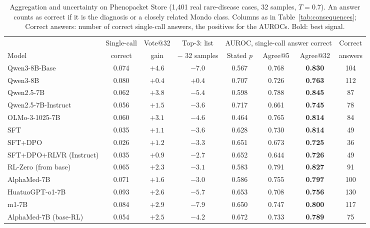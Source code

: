 \documentclass[wcp]{jmlr}
\begin{document}
\begin{table}[t]
\centering\small
\begin{adjustbox}{max width=\linewidth}
\begin{tabular}{lccccccc}
\toprule
 & Single-call & Vote@32 & Top-3: list & \multicolumn{3}{c}{AUROC, single-call answer correct} & Correct \\
Model & correct & gain & $-$ 32 samples & Stated $p$ & Agree@5 & Agree@32 & answers \\
\midrule
Qwen3-8B-Base & 0.074 & $+4.6$ & $-7.0$ & 0.567 & 0.768 & \textbf{0.830} & 104 \\
Qwen3-8B & 0.080 & $+0.4$ & $+0.4$ & 0.707 & 0.726 & \textbf{0.763} & 112 \\
Qwen2.5-7B & 0.062 & $+3.8$ & $-5.4$ & 0.598 & 0.788 & \textbf{0.845} & 87 \\
Qwen2.5-7B-Instruct & 0.056 & $+1.5$ & $-3.6$ & 0.717 & 0.661 & \textbf{0.745} & 78 \\
\midrule
OLMo-3-1025-7B & 0.060 & $+3.1$ & $-4.6$ & 0.464 & 0.765 & \textbf{0.814} & 84 \\
\quad SFT & 0.035 & $+1.1$ & $-3.6$ & 0.628 & 0.730 & \textbf{0.814} & 49 \\
\quad SFT+DPO & 0.026 & $+1.2$ & $-3.3$ & 0.651 & 0.673 & \textbf{0.725} & 36 \\
\quad SFT+DPO+RLVR (Instruct) & 0.035 & $+0.9$ & $-2.7$ & 0.652 & 0.644 & \textbf{0.726} & 49 \\
\quad RL-Zero (from base) & 0.065 & $+2.3$ & $-3.1$ & 0.583 & 0.791 & \textbf{0.827} & 91 \\
\midrule
AlphaMed-7B & 0.071 & $+1.6$ & $-3.0$ & 0.586 & 0.755 & \textbf{0.797} & 100 \\
HuatuoGPT-o1-7B & 0.093 & $+2.6$ & $-5.7$ & 0.653 & 0.708 & \textbf{0.756} & 130 \\
m1-7B & 0.084 & $+2.9$ & $-7.9$ & 0.650 & 0.747 & \textbf{0.800} & 117 \\
AlphaMed-7B (base-RL) & 0.054 & $+2.5$ & $-4.2$ & 0.672 & 0.733 & \textbf{0.789} & 75 \\
\bottomrule
\end{tabular}
\end{adjustbox}
\caption{Aggregation and uncertainty on Phenopacket Store (1,401 real rare-disease cases, 32 samples, $T{=}0.7$). An answer counts as correct if it is the diagnosis or a closely related Mondo class. Columns as in Table~\ref{tab:consequences}; Correct answers: number of correct single-call answers, the positives for the AUROCs. Bold: best signal.}
\label{tab:pheno}
\end{table}
\end{document}
